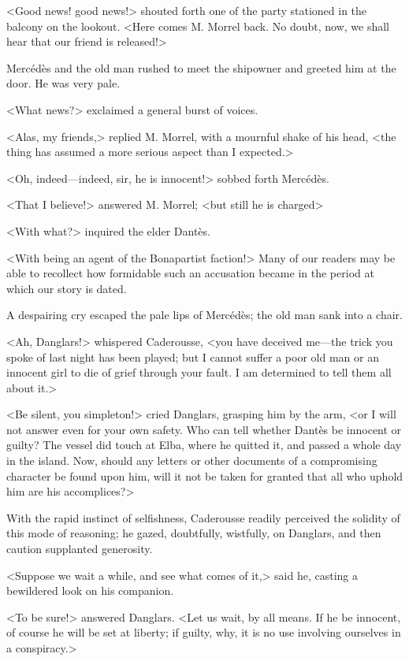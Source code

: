  <Good news! good news!> shouted forth one of the party stationed in the balcony on the lookout. <Here comes M. Morrel back. No doubt, now, we shall hear that our friend is released!> 

 Mercédès and the old man rushed to meet the shipowner and greeted him at the door. He was very pale. 

 <What news?> exclaimed a general burst of voices. 

 <Alas, my friends,> replied M. Morrel, with a mournful shake of his head, <the thing has assumed a more serious aspect than I expected.> 

 <Oh, indeed—indeed, sir, he is innocent!> sobbed forth Mercédès. 

 <That I believe!> answered M. Morrel; <but still he is charged\longdash> 

 <With what?> inquired the elder Dantès. 

 <With being an agent of the Bonapartist faction!> Many of our readers may be able to recollect how formidable such an accusation became in the period at which our story is dated. 

 A despairing cry escaped the pale lips of Mercédès; the old man sank into a chair. 

 <Ah, Danglars!> whispered Caderousse, <you have deceived me—the trick you spoke of last night has been played; but I cannot suffer a poor old man or an innocent girl to die of grief through your fault. I am determined to tell them all about it.> 

 <Be silent, you simpleton!> cried Danglars, grasping him by the arm, <or I will not answer even for your own safety. Who can tell whether Dantès be innocent or guilty? The vessel did touch at Elba, where he quitted it, and passed a whole day in the island. Now, should any letters or other documents of a compromising character be found upon him, will it not be taken for granted that all who uphold him are his accomplices?> 

 With the rapid instinct of selfishness, Caderousse readily perceived the solidity of this mode of reasoning; he gazed, doubtfully, wistfully, on Danglars, and then caution supplanted generosity. 

 <Suppose we wait a while, and see what comes of it,> said he, casting a bewildered look on his companion. 

 <To be sure!> answered Danglars. <Let us wait, by all means. If he be innocent, of course he will be set at liberty; if guilty, why, it is no use involving ourselves in a conspiracy.> 

